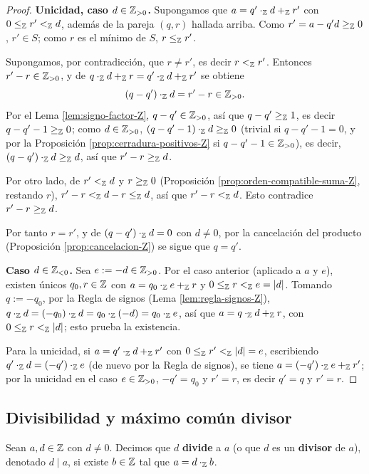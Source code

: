 \documentclass[12pt,a4paper]{book}
\begin{document}
\begin{proof}
        \textbf{Unicidad, caso $d\in\mathbb{Z}_{>0}$.} Supongamos que $a=q'\cdot_{\mathbb{Z}}d+_{\mathbb{Z}}r'$ con $0\le_{\mathbb{Z}}r'<_{\mathbb{Z}}d$, además de la pareja $(q,r)$ hallada arriba. Como $r'=a-q'd\ge_{\mathbb{Z}}0$, $r'\in S$; como $r$ es el mínimo de $S$, $r\le_{\mathbb{Z}}r'$.

        Supongamos, por contradicción, que $r\neq r'$, es decir $r<_{\mathbb{Z}}r'$. Entonces $r'-r\in\mathbb{Z}_{>0}$, y de $q\cdot_{\mathbb{Z}}d+_{\mathbb{Z}}r=q'\cdot_{\mathbb{Z}}d+_{\mathbb{Z}}r'$ se obtiene
        \begin{equation*}
            (q-q')\cdot_{\mathbb{Z}}d = r'-r \in\mathbb{Z}_{>0}.
        \end{equation*}
        Por el Lema \ref{lem:signo-factor-Z}, $q-q'\in\mathbb{Z}_{>0}$, así que $q-q'\ge_{\mathbb{Z}}1$, es decir $q-q'-1\ge_{\mathbb{Z}}0$; como $d\in\mathbb{Z}_{>0}$, $(q-q'-1)\cdot_{\mathbb{Z}}d\ge_{\mathbb{Z}}0$ (trivial si $q-q'-1=0$, y por la Proposición \ref{prop:cerradura-positivos-Z} si $q-q'-1\in\mathbb{Z}_{>0}$), es decir, $(q-q')\cdot_{\mathbb{Z}}d\ge_{\mathbb{Z}}d$, así que $r'-r\ge_{\mathbb{Z}}d$.

        Por otro lado, de $r'<_{\mathbb{Z}}d$ y $r\ge_{\mathbb{Z}}0$ (Proposición \ref{prop:orden-compatible-suma-Z}, restando $r$), $r'-r<_{\mathbb{Z}}d-r\le_{\mathbb{Z}}d$, así que $r'-r<_{\mathbb{Z}}d$. Esto contradice $r'-r\ge_{\mathbb{Z}}d$.

        Por tanto $r=r'$, y de $(q-q')\cdot_{\mathbb{Z}}d=0$ con $d\neq0$, por la cancelación del producto (Proposición \ref{prop:cancelacion-Z}) se sigue que $q=q'$.

        \textbf{Caso $d\in\mathbb{Z}_{<0}$.} Sea $e:=-d\in\mathbb{Z}_{>0}$. Por el caso anterior (aplicado a $a$ y $e$), existen únicos $q_{0},r\in\mathbb{Z}$ con $a=q_{0}\cdot_{\mathbb{Z}}e+_{\mathbb{Z}}r$ y $0\le_{\mathbb{Z}}r<_{\mathbb{Z}}e=|d|$. Tomando $q:=-q_{0}$, por la Regla de signos (Lema \ref{lem:regla-signos-Z}), $q\cdot_{\mathbb{Z}}d=(-q_{0})\cdot_{\mathbb{Z}}d=q_{0}\cdot_{\mathbb{Z}}(-d)=q_{0}\cdot_{\mathbb{Z}}e$, así que $a=q\cdot_{\mathbb{Z}}d+_{\mathbb{Z}}r$, con $0\le_{\mathbb{Z}}r<_{\mathbb{Z}}|d|$; esto prueba la existencia.

        Para la unicidad, si $a=q'\cdot_{\mathbb{Z}}d+_{\mathbb{Z}}r'$ con $0\le_{\mathbb{Z}}r'<_{\mathbb{Z}}|d|=e$, escribiendo $q'\cdot_{\mathbb{Z}}d=(-q')\cdot_{\mathbb{Z}}e$ (de nuevo por la Regla de signos), se tiene $a=(-q')\cdot_{\mathbb{Z}}e+_{\mathbb{Z}}r'$; por la unicidad en el caso $e\in\mathbb{Z}_{>0}$, $-q'=q_{0}$ y $r'=r$, es decir $q'=q$ y $r'=r$.
    \end{proof}

    \subsection{Divisibilidad y máximo común divisor}

    \begin{definicion}[Divisor]
        \label{def:divide-Z}
        Sean $a,d\in\mathbb{Z}$ con $d\neq0$. Decimos que $d$ \textbf{divide} a $a$ (o que $d$ es un \textbf{divisor} de $a$), denotado $d\mid a$, si existe $b\in\mathbb{Z}$ tal que $a=d\cdot_{\mathbb{Z}}b$.
    \end{definicion}
\end{document}
